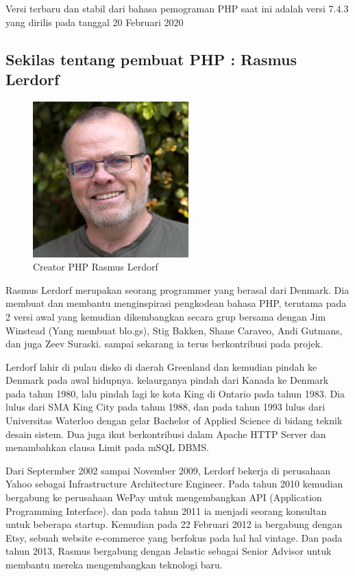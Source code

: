 \begin{enumerate}
Versi terbaru dan stabil dari bahasa pemograman PHP saat ini adalah versi 7.4.3 yang dirilis pada tanggal 20 Februari 2020

\subsection{Sekilas tentang pembuat PHP : Rasmus Lerdorf}
	\begin{figure}[H]
		\includegraphics[width=6cm]{figures/web/rasmuslerdorf.jpg}
		\centering
		\caption{Creator PHP Rasmus Lerdorf }
	\end{figure}
Rasmus Lerdorf merupakan seorang programmer yang berasal dari Denmark. Dia membuat dan membantu menginspirasi pengkodean bahasa PHP, terutama pada 2 versi awal yang kemudian dikembangkan secara grup bersama dengan Jim Winstead (Yang membuat blo.gs), Stig Bakken, Shane Caraveo, Andi Gutmans, dan juga Zeev Suraski. sampai sekarang ia terus berkontribusi pada projek.

Lerdorf lahir di pulau disko di daerah Greenland dan kemudian pindah ke Denmark pada awal hidupnya. kelaurganya pindah dari Kanada ke Denmark pada tahun 1980, lalu pindah lagi ke kota King di Ontario pada tahun 1983. Dia lulus dari SMA King City pada tahun 1988, dan pada tahun 1993 lulus dari Universitas Waterloo dengan gelar  Bachelor of Applied Science di bidang teknik desain sistem. Dua juga ikut berkontribusi dalam Apache HTTP Server dan menambahkan clausa Limit pada mSQL DBMS. 

Dari Septermber 2002 sampai November 2009, Lerdorf bekerja di perusahaan Yahoo sebagai Infrastructure Architecture Engineer. Pada tahun 2010 kemudian bergabung ke perusahaan WePay untuk mengembangkan API (Application Programming Interface). dan pada tahun 2011 ia menjadi seorang konsultan untuk beberapa startup. Kemudian pada 22 Februari 2012 ia bergabung dengan Etsy, sebuah website e-commerce yang berfokus pada hal hal vintage. Dan pada tahun 2013, Rasmus bergabung dengan Jelastic sebagai Senior Advisor untuk membantu mereka mengembangkan teknologi baru.


\end{enumerate}
